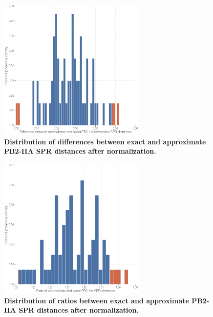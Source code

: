 \documentclass[11pt,oneside,letterpaper]{article}
\begin{document}
\begin{figure}
\centering  
\includegraphics[width=0.65\textwidth]  {supp_figures/InfB_supp_NormPB2-HA_hist.png}
\caption{\textbf{Distribution of differences between exact and approximate PB2-HA SPR distances after normalization.}}
\label{NormSPR_PB2-HA_difference}
\end{figure}

\begin{figure}
\centering  
\includegraphics[width=0.65\textwidth]  {supp_figures/InfB_supp_PB2-HA_hist2.png}
\caption{\textbf{Distribution of ratios between exact and approximate PB2-HA SPR distances after normalization.}}
\label{NormSPR_PB2-HA_ratio}
\end{figure}
\end{document}
